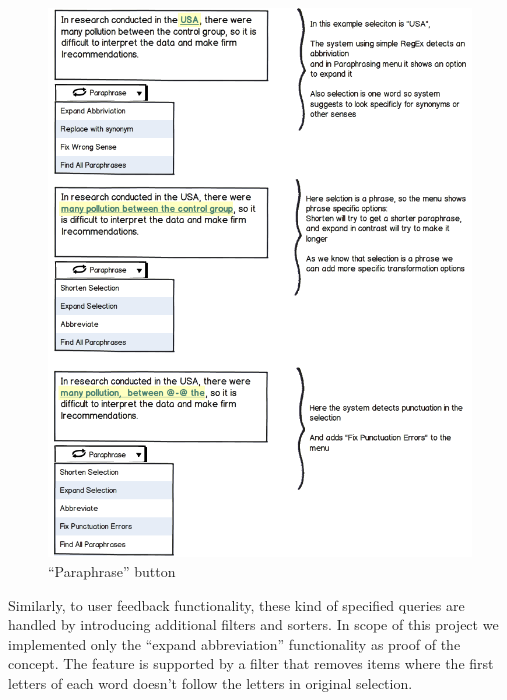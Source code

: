 \begin{figure}
 \centering 
 \includegraphics[scale=0.8]{g/button.png}
 \caption{``Paraphrase'' button}
\end{figure}

Similarly, to user feedback functionality, these kind of specified queries are handled by introducing additional filters and sorters. In scope of this project we implemented only the ``expand abbreviation'' functionality as proof of the concept. The feature is supported by a filter that removes items where the first letters of each word doesn't follow the letters in original selection.
